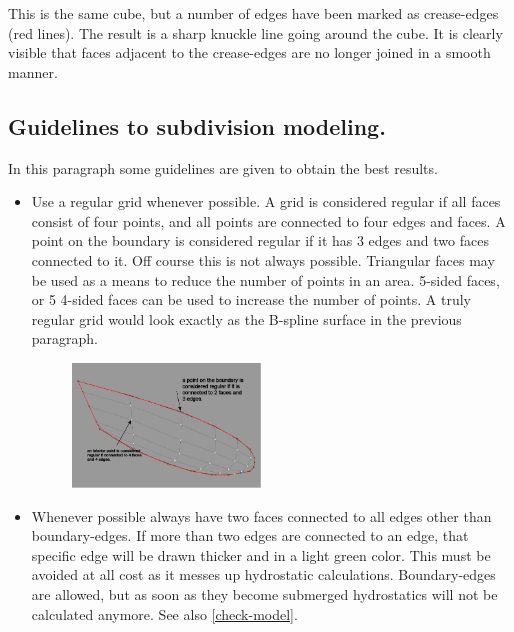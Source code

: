 \documentclass[12pt]{article}
\begin{document}
This is the same cube, but a number of edges have been marked as
crease-edges (red lines). The result is a sharp knuckle line going
around the cube. It is clearly visible that faces adjacent to the
crease-edges are no longer joined in a smooth manner.
\pagebreak

\subsection{Guidelines to subdivision modeling.} \label{guidelines}
In this paragraph some guidelines are given to obtain the best
results.

\begin{itemize}

\item Use a regular grid whenever possible. A grid is considered
regular if all faces consist of four points, and all points are
connected to four edges and faces. A point on the boundary is
considered regular if it has 3 edges and two faces connected to
it. Off course this is not always possible.  Triangular faces may be
used as a means to reduce the number of points in an area.  5-sided
faces, or 5 4-sided faces can be used to increase the number of
points. A truly regular grid would look exactly as the B-spline
surface in the previous paragraph.

\begin{figure}[h]
        \centering
        \includegraphics[width=5cm,natwidth=583,natheight=386]{figure7.png}
        \caption{}
        \label{fig:mesh6}
\end{figure}


  \item Whenever possible always have two faces connected to all edges
other than boundary-edges. If more than two edges are connected to an
edge, that specific edge will be drawn thicker and in a light green
color. This must be avoided at all cost as it messes up hydrostatic
calculations. Boundary-edges are allowed, but as soon as they become
submerged hydrostatics will not be calculated anymore. See also \ref{check-model}.


\end{itemize}
\end{document}
